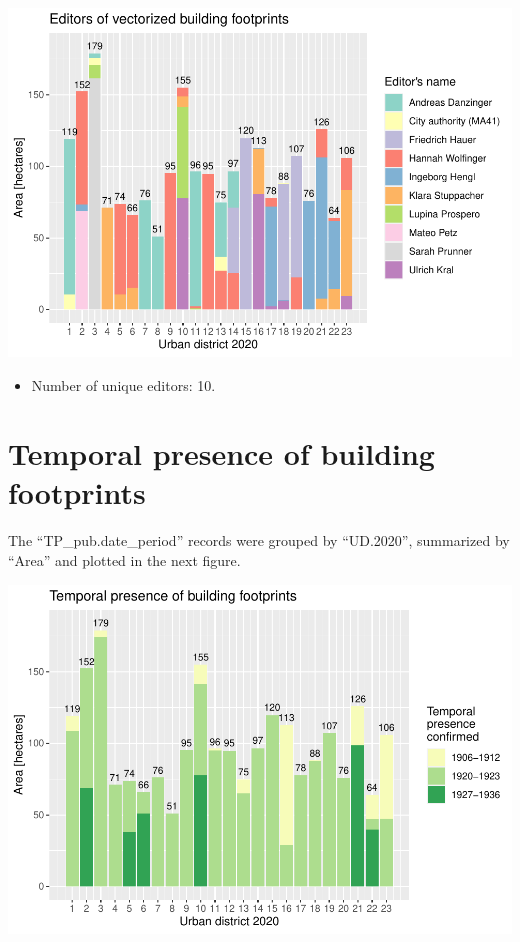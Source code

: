 \documentclass[
]{article}
\providecommand{\tightlist}{%
  \setlength{\itemsep}{0pt}\setlength{\parskip}{0pt}}
\begin{document}
\includegraphics{Usage_code_files/figure-latex/unnamed-chunk-6-1.pdf}

\begin{itemize}
\tightlist
\item
  Number of unique editors: 10.
\end{itemize}

\hypertarget{temporal-presence-of-building-footprints}{%
\section{Temporal presence of building
footprints}\label{temporal-presence-of-building-footprints}}

The ``TP\_pub.date\_period'' records were grouped by ``UD.2020'',
summarized by ``Area'' and plotted in the next figure.

\includegraphics{Usage_code_files/figure-latex/unnamed-chunk-7-1.pdf}
\end{document}
